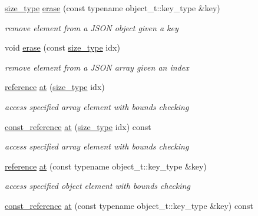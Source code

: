\begin{DoxyCompactItemize}
\hyperlink{classnlohmann_1_1basic__json_a1579a8f72a230358d6cd1a6e8a62859b}{size\-\_\-type} \hyperlink{classnlohmann_1_1basic__json_aa36e72ffc3241b960fe9186d19e03bc3}{erase} (const typename object\-\_\-t\-::key\-\_\-type \&key)
\begin{DoxyCompactList}\small\item\em remove element from a J\-S\-O\-N object given a key \end{DoxyCompactList}\item 
void \hyperlink{classnlohmann_1_1basic__json_a3da254c422ede5495f2815c5e48c00c5}{erase} (const \hyperlink{classnlohmann_1_1basic__json_a1579a8f72a230358d6cd1a6e8a62859b}{size\-\_\-type} idx)
\begin{DoxyCompactList}\small\item\em remove element from a J\-S\-O\-N array given an index \end{DoxyCompactList}\item 
\hyperlink{classnlohmann_1_1basic__json_a3ec8e17be8732fe436e9d6733f52b7a3}{reference} \hyperlink{classnlohmann_1_1basic__json_a214a8c22d616fd3567b88932c07436c9}{at} (\hyperlink{classnlohmann_1_1basic__json_a1579a8f72a230358d6cd1a6e8a62859b}{size\-\_\-type} idx)
\begin{DoxyCompactList}\small\item\em access specified array element with bounds checking \end{DoxyCompactList}\item 
\hyperlink{classnlohmann_1_1basic__json_af677a29b0e66edc9f66e5167e4667071}{const\-\_\-reference} \hyperlink{classnlohmann_1_1basic__json_ab31368c0b67f8e4f291a45e6498018be}{at} (\hyperlink{classnlohmann_1_1basic__json_a1579a8f72a230358d6cd1a6e8a62859b}{size\-\_\-type} idx) const 
\begin{DoxyCompactList}\small\item\em access specified array element with bounds checking \end{DoxyCompactList}\item 
\hyperlink{classnlohmann_1_1basic__json_a3ec8e17be8732fe436e9d6733f52b7a3}{reference} \hyperlink{classnlohmann_1_1basic__json_a7ed92d56cb313b243c1917696ffdf074}{at} (const typename object\-\_\-t\-::key\-\_\-type \&key)
\begin{DoxyCompactList}\small\item\em access specified object element with bounds checking \end{DoxyCompactList}\item 
\hyperlink{classnlohmann_1_1basic__json_af677a29b0e66edc9f66e5167e4667071}{const\-\_\-reference} \hyperlink{classnlohmann_1_1basic__json_a674de1ee73e6bf4843fc5dc1351fb726}{at} (const typename object\-\_\-t\-::key\-\_\-type \&key) const 

\end{DoxyCompactItemize}
